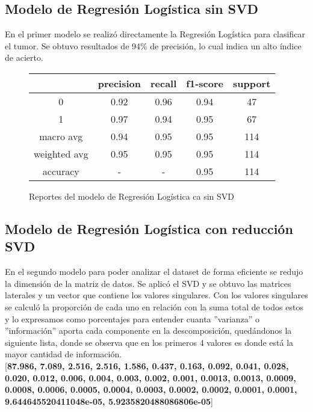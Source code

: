 \documentclass[a4paper,10pt,twocolumn]{article}
\begin{document}
\subsection{Modelo de Regresión Logística sin SVD}
En el primer modelo se realizó directamente la Regresión Logística para clasificar el tumor. Se obtuvo resultados de 94\% de precisión, lo cual indica un alto índice de acierto. 
	\begin{figure}[h!]%
		\begin{center}
			\begin{tabular}{|c|c|c|c|c|} \hline
			 			& precision 	& recall& f1-score &support	\\ \hline
			0 			&  	0.92		& 0.96 	&0.94	&47	\\ \hline
			1			& 	0.97		& 0.94	&0.95&67	\\ \hline
    
   macro avg 			&  	0.94		& 0.95 	&0.95	&114	\\ \hline
			weighted avg			& 0.95	& 0.95	&0.95&114	\\ \hline
   accuracy &- &-& 0.95&114\\ \hline
			\end{tabular}
		\caption{Reportes del modelo de Regresión Logística ca sin SVD \label{fig:ex}}
		\end{center}
		\end{figure}
   
\subsection{Modelo de Regresión Logística con reducción SVD}
En el segundo modelo para poder analizar el dataset de forma eficiente se redujo la dimensión de la matriz de datos. Se aplicó el SVD y se obtuvo las matrices laterales y un vector que contiene los valores singulares. Con los valores singulares se calculó la proporción de cada uno en relación con la suma total de todos estos y lo expresamos como porcentajes para entender cuanta ”varianza” o ”información” aporta cada componente en la descomposición, quedándonos la siguiente lista, donde se observa que en los primeros 4 valores es donde está la mayor cantidad de información.\\

[\textbf{87.986, 
        7.089, 
        2.516,
        2.516,
        1.586,
        0.437,
         0.163,
         0.092,
         0.041,
         0.028,
         0.020,
         0.012,
         0.006,
         0.004,
         0.003,
          0.002,
          0.001,
          0.0013,
          0.0013,
          0.0009,
          0.0008,
           0.0006,
           0.0005,
           0.0004,
           0.0003,
           0.0002,
           0.0002,
           0.0001,
           0.0001,
           9.644645520411048e-05,
           5.9235820488086806e-05}]
\end{document}
